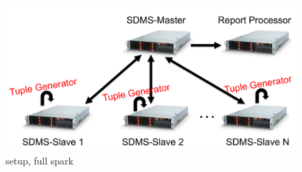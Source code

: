 \begin{figure}[t]
\centering
\includegraphics[width=1\linewidth]{figures/spark-full-diagram.pdf}
\caption{setup, full spark}
\label{fig:sb1-tput}
\end{figure}



